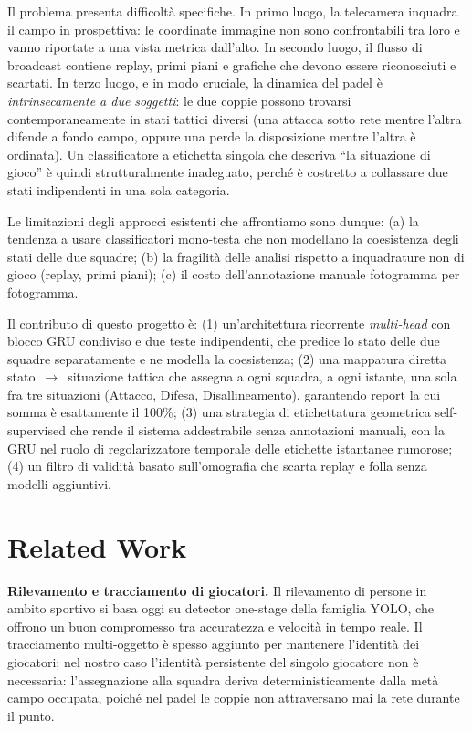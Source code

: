 \documentclass[10pt,twocolumn,a4paper]{article}
\begin{document}
	Il problema presenta difficoltà specifiche. In primo luogo, la telecamera
	inquadra il campo in prospettiva: le coordinate immagine non sono
	confrontabili tra loro e vanno riportate a una vista metrica dall'alto. In
	secondo luogo, il flusso di broadcast contiene replay, primi piani e
	grafiche che devono essere riconosciuti e scartati. In terzo luogo, e in
	modo cruciale, la dinamica del padel è \emph{intrinsecamente a due soggetti}:
	le due coppie possono trovarsi contemporaneamente in stati tattici diversi
	(una attacca sotto rete mentre l'altra difende a fondo campo, oppure una
	perde la disposizione mentre l'altra è ordinata). Un classificatore a
	etichetta singola che descriva ``la situazione di gioco'' è quindi
	strutturalmente inadeguato, perché è costretto a collassare due stati
	indipendenti in una sola categoria.

	Le limitazioni degli approcci esistenti che affrontiamo sono dunque: (a) la
	tendenza a usare classificatori mono-testa che non modellano la coesistenza
	degli stati delle due squadre; (b) la fragilità delle analisi rispetto a
	inquadrature non di gioco (replay, primi piani); (c) il costo
	dell'annotazione manuale fotogramma per fotogramma.

	Il contributo di questo progetto è: (1) un'architettura ricorrente \emph{multi-head} con
	blocco GRU condiviso e due teste indipendenti, che predice lo stato delle due
	squadre separatamente e ne modella la coesistenza; (2) una mappatura diretta
	stato~$\rightarrow$~situazione tattica che assegna a ogni squadra, a ogni
	istante, una sola fra tre situazioni (Attacco, Difesa, Disallineamento),
	garantendo report la cui somma è esattamente il 100\%; (3) una strategia di
	etichettatura geometrica self-supervised che rende il sistema addestrabile
	senza annotazioni manuali, con la GRU nel ruolo di regolarizzatore temporale
	delle etichette istantanee rumorose; (4) un filtro di validità basato
	sull'omografia che scarta replay e folla senza modelli aggiuntivi.

	\section{Related Work}
	\label{sec:related}

	\textbf{Rilevamento e tracciamento di giocatori.} Il rilevamento di persone
	in ambito sportivo si basa oggi su detector one-stage della famiglia
	YOLO, che offrono un buon compromesso
	tra accuratezza e velocità in tempo reale. Il tracciamento multi-oggetto è
	spesso aggiunto per mantenere l'identità dei giocatori; nel nostro caso
	l'identità persistente del singolo giocatore non è necessaria: l'assegnazione
	alla squadra deriva deterministicamente dalla metà campo occupata, poiché nel
	padel le coppie non attraversano mai la rete durante il punto.
\end{document}
